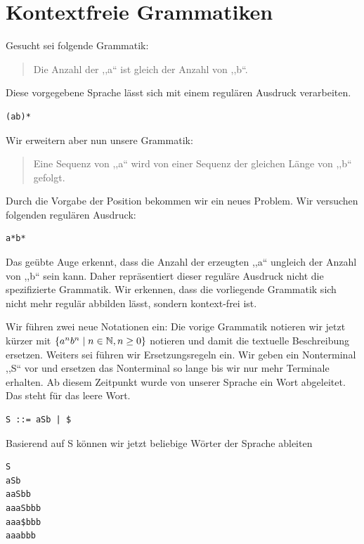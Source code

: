 \section{Kontextfreie Grammatiken}
%
Gesucht sei folgende Grammatik:
\begin{quote}
  Die Anzahl der ,,a`` ist gleich der Anzahl von ,,b``. 
\end{quote}

Diese vorgegebene Sprache lässt sich mit einem regulären Ausdruck verarbeiten.
\begin{lstlisting}
(ab)*
\end{lstlisting}

Wir erweitern aber nun unsere Grammatik:
\begin{quote}
  Eine Sequenz von ,,a`` wird von einer Sequenz der gleichen Länge von ,,b`` gefolgt.
\end{quote}

Durch die Vorgabe der Position bekommen wir ein neues Problem. Wir versuchen folgenden regulären Ausdruck:
\begin{lstlisting}
a*b*
\end{lstlisting}

Das geübte Auge erkennt, dass die Anzahl der erzeugten ,,a`` ungleich der Anzahl von ,,b`` sein kann. Daher repräsentiert dieser reguläre Ausdruck nicht die spezifizierte Grammatik. Wir erkennen, dass die vorliegende Grammatik sich nicht mehr regulär abbilden lässt, sondern kontext-frei ist.

Wir führen zwei neue Notationen ein: Die vorige Grammatik notieren wir jetzt kürzer mit $\left\{a^n b^n \mid n \in \mathbb{N}, n \geq 0\right\}$ notieren und damit die textuelle Beschreibung ersetzen. Weiters sei führen wir Ersetzungsregeln ein. Wir geben ein Nonterminal ,,S`` vor und ersetzen das Nonterminal so lange bis wir nur mehr Terminale erhalten. Ab diesem Zeitpunkt wurde von unserer Sprache ein Wort abgeleitet. Das \textdollar{} steht für das leere Wort.

\begin{lstlisting}
S ::= aSb | $
\end{lstlisting}

Basierend auf S können wir jetzt beliebige Wörter der Sprache ableiten
\begin{lstlisting}
S
aSb
aaSbb
aaaSbbb
aaa$bbb
aaabbb
\end{lstlisting}

